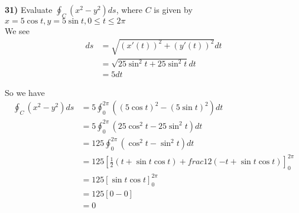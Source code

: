 \documentclass{scrartcl}
\begin{document}
\textbf{31)} Evaluate $\oint_C\left(x^2-y^2\right)ds$, where $C$ is given by $x=5\cos t, y=5\sin t, 0\le t\le2\pi$\\
We see
\begin{align*}
  ds &= \sqrt{\left(x'(t)\right)^2 + \left(y'(t)\right)^2}dt\\
  &= \sqrt{25\sin^2t + 25\sin^2t}dt\\
  &= 5dt
\end{align*}

So we have
\begin{align*}
  \oint_C\left(x^2-y^2\right)ds &= 5\oint_0^{2\pi}\left(\left(5\cos t\right)^2-\left(5\sin t\right)^2\right)dt\\
  &= 5\oint_0^{2\pi}\left(25\cos^2t-25\sin^2t\right)dt\\
  &= 125\oint_0^{2\pi}\left(\cos^2t-\sin^2t\right)dt\\
  &= 125\left[\frac{1}{2}\left(t + \sin t\cos t\right) + frac{1}{2}\left(-t + \sin t\cos t\right)\right]_0^{2\pi}\\
  &= 125\left[\sin t\cos t\right]_0^{2\pi}\\
  &= 125\left[0-0\right]\\
  &= 0
\end{align*}
\end{document}

